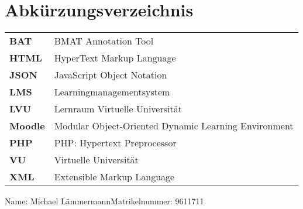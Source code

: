 \documentclass[twoside,bibliography=totoc,openany]{fumi}
\newcommand{\thesisauthor}{Michael Lämmermann}
\newcommand{\thesismatrikelnummer}{9611711}
\begin{document}
\renewcommand\lstlistlistingname{Verzeichnis der Auflistungen}
\lstlistoflistings
\cleardoublepage


\renewcommand*\listalgorithmcfname{Verzeichnis der Algorithmen}
\listofalgorithms
\cleardoublepage


\chapter*{Abkürzungsverzeichnis}


\renewcommand*{\arraystretch}{1.4}
\setlength{\LTleft}{0pt}
\begin{longtable}[l]{p{2cm}p{15cm}}
\textbf{BAT} & BMAT Annotation Tool \\
\textbf{HTML} & HyperText Markup Language \\
\textbf{JSON} & JavaScript Object Notation \\
\textbf{LMS} & Learningmanagementsystem \\
\textbf{LVU} & Lernraum Virtuelle Universität \\
\textbf{Moodle} & Modular Object-Oriented Dynamic Learning Environment \\
\textbf{PHP} & PHP: Hypertext Preprocessor \\
\textbf{VU} & Virtuelle Universität \\
\textbf{XML} & Extensible Markup Language \\
\end{longtable}

\cleardoublepage


Name: \thesisauthor \hfill Matrikelnummer: \thesismatrikelnummer \vspace{2cm}
\end{document}
